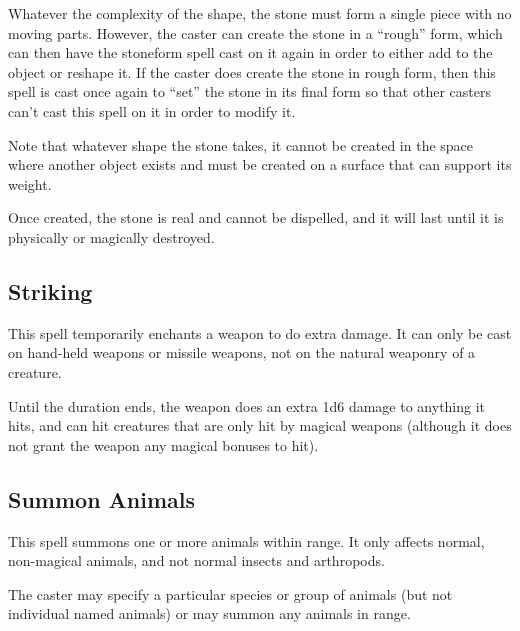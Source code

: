 \begin{multicols*}{2}
Whatever the complexity of the shape, the stone must form a single piece with no moving parts. However, the caster can create the stone in a “rough” form, which can then have the stoneform spell cast on it again in order to either add to the object or reshape it. If the caster does create the stone in rough form, then this spell is cast once again to “set” the stone in its final form so that other casters can’t cast this spell on it in order to modify it.

Note that whatever shape the stone takes, it cannot be created in the space where another object exists and must be created on a surface that can support its weight.

Once created, the stone is real and cannot be dispelled, and it will last until it is physically or magically destroyed.

\subsection{Striking}\label{spell:Striking}

This spell temporarily enchants a weapon to do extra damage. It can only be cast on hand-held weapons or missile weapons, not on the natural weaponry of a creature.

Until the duration ends, the weapon does an extra 1d6 damage to anything it hits, and can hit creatures that are only hit by magical weapons (although it does not grant the weapon any magical bonuses to hit).

\subsection{Summon Animals}\label{spell:Summon Animals}

This spell summons one or more animals within range. It only affects normal, non-magical animals, and not normal insects and arthropods.

The caster may specify a particular species or group of animals (but not individual named animals) or may summon any animals in range.


\end{multicols*}
